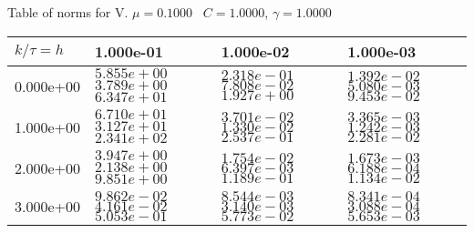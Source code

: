 \begin{center}
Table of norms for V. $\mu = 0.1000$ \, $C = 1.0000$, $\gamma = 1.0000$
  
\begin{tabular}{|p{1in}|p{1in}|p{1in}|p{1in}|} \hline
$k / \tau = h$ &1.000e-01 &1.000e-02 &1.000e-03 \\ \hline 
0.000e+00 & $5.855e+00$  $3.789e+00$  $6.347e+01$  & $2.318e-01$  $7.808e-02$  $1.927e+00$  & $1.392e-02$  $5.080e-03$  $9.453e-02$  \\ \hline 
1.000e+00 & $6.710e+01$  $3.127e+01$  $2.341e+02$  & $3.701e-02$  $1.330e-02$  $2.537e-01$  & $3.365e-03$  $1.242e-03$  $2.281e-02$  \\ \hline 
2.000e+00 & $3.947e+00$  $2.138e+00$  $9.851e+00$  & $1.754e-02$  $6.397e-03$  $1.189e-01$  & $1.673e-03$  $6.188e-04$  $1.134e-02$  \\ \hline 
3.000e+00 & $9.862e-02$  $4.161e-02$  $5.053e-01$  & $8.544e-03$  $3.140e-03$  $5.773e-02$  & $8.341e-04$  $3.088e-04$  $5.653e-03$  \\ \hline 

\end{tabular}\\[20pt]
\end{center}
